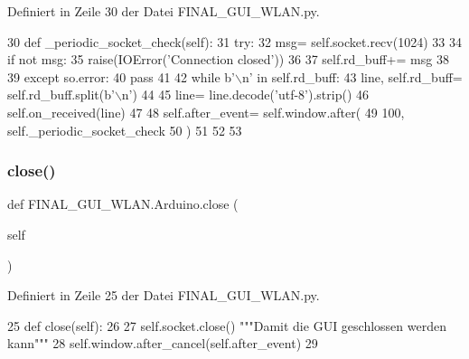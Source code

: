 Definiert in Zeile 30 der Datei F\+I\+N\+A\+L\+\_\+\+G\+U\+I\+\_\+\+W\+L\+A\+N.\+py.


\begin{DoxyCode}
30     \textcolor{keyword}{def }\_periodic\_socket\_check(self):
31         \textcolor{keywordflow}{try}:
32             msg= self.socket.recv(1024)
33 
34             \textcolor{keywordflow}{if} \textcolor{keywordflow}{not} msg:
35                 raise(IOError(\textcolor{stringliteral}{'Connection closed'}))
36 
37             self.rd\_buff+= msg
38 
39         \textcolor{keywordflow}{except} so.error:
40             \textcolor{keywordflow}{pass}
41 
42         \textcolor{keywordflow}{while} b\textcolor{stringliteral}{'\(\backslash\)n'} \textcolor{keywordflow}{in} self.rd\_buff:
43             line, self.rd\_buff= self.rd\_buff.split(b\textcolor{stringliteral}{'\(\backslash\)n'})
44 
45             line= line.decode(\textcolor{stringliteral}{'utf-8'}).strip()
46             self.on\_received(line)
47 
48         self.after\_event= self.window.after(
49             100, self.\_periodic\_socket\_check
50         )
51 
52 
53 
\end{DoxyCode}
\mbox{\label{class_f_i_n_a_l___g_u_i___w_l_a_n_1_1_arduino_a07b83bfe05b0faf47ad2e6730d3ae795}} 
\subsubsection{\texorpdfstring{close()}{close()}}
{\footnotesize\ttfamily def F\+I\+N\+A\+L\+\_\+\+G\+U\+I\+\_\+\+W\+L\+A\+N.\+Arduino.\+close (\begin{DoxyParamCaption}\item[{}]{self }\end{DoxyParamCaption})}



Definiert in Zeile 25 der Datei F\+I\+N\+A\+L\+\_\+\+G\+U\+I\+\_\+\+W\+L\+A\+N.\+py.


\begin{DoxyCode}
25     \textcolor{keyword}{def }close(self):
26 
27         self.socket.close()                            \textcolor{stringliteral}{"""Damit die GUI geschlossen werden kann"""}
28         self.window.after\_cancel(self.after\_event)
29 
\end{DoxyCode}
\mbox{\label{class_f_i_n_a_l___g_u_i___w_l_a_n_1_1_arduino_a2a13c6006cd466ac37ce8e2033d04e96}} 
